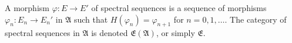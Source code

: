 A morphism $\varphi : E \to E'$ of spectral sequences is a sequence of morphisms $\varphi_n : E_n \to E_n'$ in $\mathfrak{A}$ such that $H(\varphi_n) = \varphi_{n+1}$ for $n = 0, 1, \ldots$. The category of spectral sequences in $\mathfrak{A}$ is denoted $\mathfrak{E}(\mathfrak{A})$, or simply $\mathfrak{E}$.
